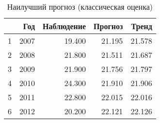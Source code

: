 \begin{table}[ht]
\centering
\begin{tabular}{rrrrr}
  \hline
 & Год & Наблюдение & Прогноз & Тренд \\ 
  \hline
1 & 2007 & 19.400 & 21.195 & 21.578 \\ 
  2 & 2008 & 21.800 & 21.511 & 21.687 \\ 
  3 & 2009 & 21.900 & 21.756 & 21.797 \\ 
  4 & 2010 & 24.300 & 21.910 & 21.906 \\ 
  5 & 2011 & 22.800 & 22.015 & 22.016 \\ 
  6 & 2012 & 20.200 & 22.121 & 22.126 \\ 
   \hline
\end{tabular}
\caption{Наилучший прогноз (классическая оценка)} 
\label{table:classical-best-prediction}
\end{table}
